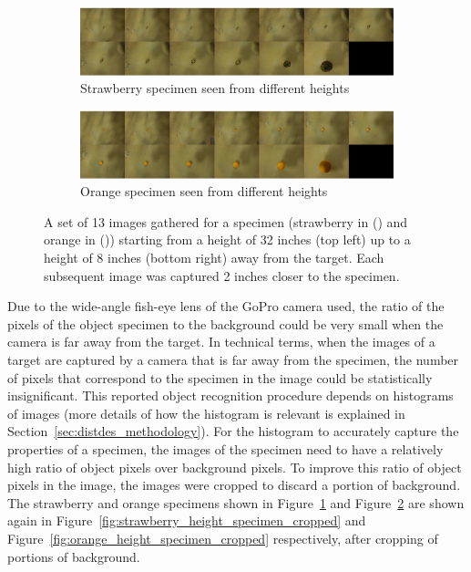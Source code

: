 \documentclass {udthesis}
\begin{document}
\begin{figure}
  \centering
  \begin{subfigure}[]{\textwidth}
      \includegraphics[width=\textwidth]{strawberry_distance_montage.eps}
      \caption{Strawberry specimen seen from different heights}
      \label{fig:strawberry_height_specimen}
  \end{subfigure}
  \begin{subfigure}[]{\textwidth}
      \includegraphics[width=\textwidth]{orange_distance_montage.eps}
      \caption{Orange specimen seen from different heights}
      \label{fig:orange_height_specimen}
  \end{subfigure}
\caption[Set of images collected for each specimen from different heights]{A set of 13 images gathered for a specimen (strawberry in () and orange in ()) starting from a height of 32 inches (top left) up to a height of 8 inches (bottom right) away from the target.
Each subsequent image was captured 2 inches closer to the specimen.}
\label{fig:height_specimen}
\end{figure}	
%
Due to the wide-angle fish-eye lens of the GoPro camera used, the ratio of the pixels of the object specimen to the background could be very small when the camera is far away from the target. In technical terms, when the images of a target are captured by a camera that is far away from the specimen, the number of pixels that correspond to the specimen in the image could be statistically insignificant. This reported object recognition procedure depends on histograms of images (more details of how the histogram is relevant is explained in Section~\ref{sec:distdes_methodology}). 
For the histogram to accurately capture the properties of a specimen, the images of the specimen need to have a relatively high ratio of object pixels over background pixels. To improve this ratio of object pixels in the image, the images were cropped to discard a portion of background. The strawberry and orange specimens shown in Figure~\ref{fig:strawberry_height_specimen} and Figure~\ref{fig:orange_height_specimen} are shown again in Figure~\ref{fig:strawberry_height_specimen_cropped} and 
Figure~\ref{fig:orange_height_specimen_cropped} respectively, after cropping of portions of background.
\end{document}
